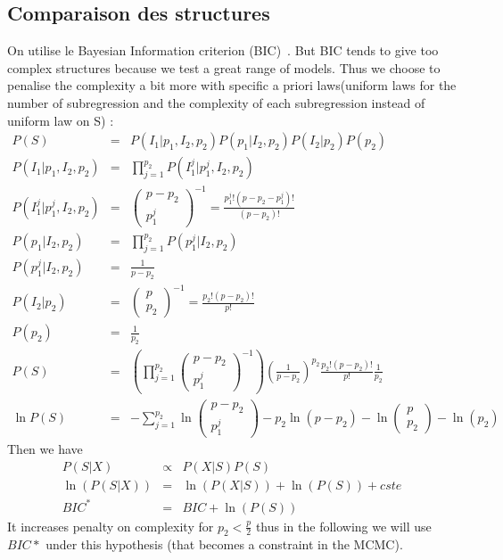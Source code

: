 \documentclass[12pt]{article}
\begin{document}
		\subsection{Comparaison des structures}
	On utilise le Bayesian Information criterion (BIC)~\cite{BIChuard}. But BIC tends to give too complex structures because we test a great range of models. Thus we choose to penalise the complexity a bit more with specific a priori laws(uniform laws for the number of subregression and the complexity of each subregression instead of uniform law on S) :
	\begin{eqnarray}
		P(S)&=&P(I_1 | p_1,I_2,p_2)P(p_1|I_2,p_2)P(I_2|p_2)P(p_2) \\
		P(I_1 | p_1,I_2,p_2)&=&\prod_{j =1}^{p_2}P(I_1^j|p_1^j,I_2,p_2) \\
		P(I_1^j|p_1^j,I_2,p_2)&=&\left(\begin{array}{c}
			p-p_2 \\ 
			p_1^j
			\end{array}  \right)^{-1} =\frac{p_1^j ! (p-p_2-p_1^j)!}{(p-p_2)!}\\
		P(p_1|I_2,p_2)&=&\prod_{j =1}^{p_2}P(p_1^j|I_2,p_2)		\\
		P(p_1^j|I_2,p_2)&=&\frac{1}{p-p_2}  \\
		P(I_2|p_2)&=&\left(\begin{array}{c}
			p \\ 
			p_2
			\end{array}  \right)^{-1}=\frac{p_2!(p-p_2)!}{p!}\\
		P(p_2) &=&\frac{1}{p_2} \\
		P(S)&=&\left(\prod_{j =1}^{p_2}\left(\begin{array}{c}
			p-p_2 \\ 
			p_1^j
			\end{array}  \right)^{-1}\right) \left(\frac{1}{p-p_2}\right)^{p_2}\frac{p_2!(p-p_2)!}{p!}\frac{1}{p_2} \\
			\ln P(S) &=& -\sum_{j=1}^{p_2}	\ln\left(\begin{array}{c}
			p-p_2 \\ 
			p_1^j
			\end{array}  \right)
			-p_2\ln (p-p_2)
			-\ln\left(\begin{array}{c}
			p \\ 
			p_2
			\end{array}  \right)
			-\ln( p_2	)
	\end{eqnarray}
	Then we have 
	\begin{eqnarray}
		P(S|X)&\propto &P(X|S)P(S) \\
		\ln(P(S|X))&=&\ln(P(X|S))+\ln(P(S))+cste \\
		BIC^*&=&BIC +\ln(P(S))
	\end{eqnarray}		
	It increases penalty on complexity for $p_2<\frac{p}{2}$ thus in the following we will use $BIC*$ under this hypothesis (that becomes a constraint in the MCMC).			
\end{document}
